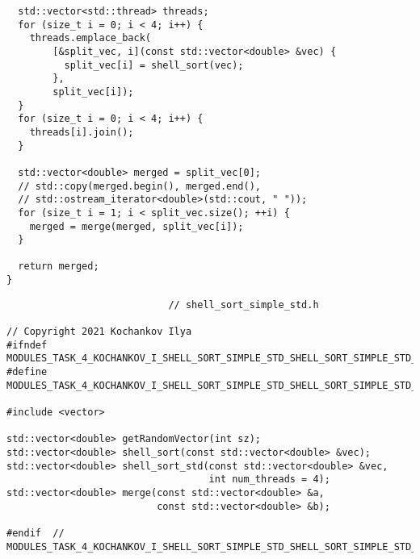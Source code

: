 \documentclass{report}
\begin{document}
\begin{lstlisting}
  std::vector<std::thread> threads;
  for (size_t i = 0; i < 4; i++) {
    threads.emplace_back(
        [&split_vec, i](const std::vector<double> &vec) {
          split_vec[i] = shell_sort(vec);
        },
        split_vec[i]);
  }
  for (size_t i = 0; i < 4; i++) {
    threads[i].join();
  }

  std::vector<double> merged = split_vec[0];
  // std::copy(merged.begin(), merged.end(),
  // std::ostream_iterator<double>(std::cout, " "));
  for (size_t i = 1; i < split_vec.size(); ++i) {
    merged = merge(merged, split_vec[i]);
  }

  return merged;
}

\end{lstlisting}
\begin{lstlisting}
							// shell_sort_simple_std.h

// Copyright 2021 Kochankov Ilya
#ifndef MODULES_TASK_4_KOCHANKOV_I_SHELL_SORT_SIMPLE_STD_SHELL_SORT_SIMPLE_STD_H_
#define MODULES_TASK_4_KOCHANKOV_I_SHELL_SORT_SIMPLE_STD_SHELL_SORT_SIMPLE_STD_H_

#include <vector>

std::vector<double> getRandomVector(int sz);
std::vector<double> shell_sort(const std::vector<double> &vec);
std::vector<double> shell_sort_std(const std::vector<double> &vec,
                                   int num_threads = 4);
std::vector<double> merge(const std::vector<double> &a,
                          const std::vector<double> &b);

#endif  // MODULES_TASK_4_KOCHANKOV_I_SHELL_SORT_SIMPLE_STD_SHELL_SORT_SIMPLE_STD_H_

\end{lstlisting}
\end{document}
